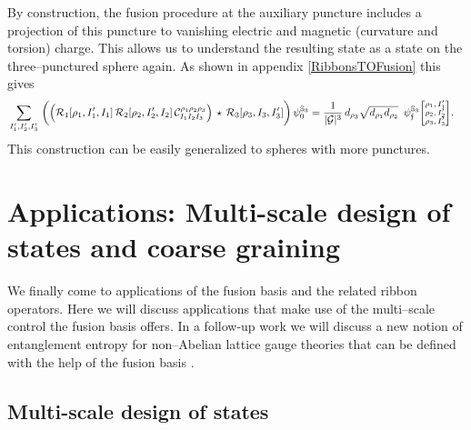 \documentclass[nofootinbib,superscriptaddress,eqsecnum,tightenlines,11pt]{revtex4-1}
\renewcommand{\S}{{\mathbb S}}
\begin{document}
By construction, the fusion procedure at the auxiliary puncture includes a projection of this puncture to vanishing electric and magnetic (curvature and torsion) charge. This allows us to understand the resulting state as a state on the three--punctured sphere again. As shown in appendix \ref{RibbonsTOFusion} this gives
\begin{align}
&\sum_{I_1',I_2',I_3'}\,    \bigg(\Big( \mathcal{R}_1[\rho_1,I_1',I_1] \, \mathcal{R}_2[\rho_2,I_2',I_2] \,  \mathcal{C}^{\rho_1\rho_2\rho_3}_{I_1 I_2 I_3}\Big) \, \star\, {\cal R}_3[\rho_3,I_3,I'_3] \bigg) \,\psi_0^{{\mathbb S}_3} = \frac{1}{|{\cal G}|^3 } \,d_{\rho_3}  \sqrt{ d_{\rho_1}d_{\rho_2} } \, \,\, \psi^{\S_3}_{\frak f}
	 { \scriptsize\begin{bmatrix} \rho_1,I_1'\\ \rho_2,I_2'\\ \rho_3,I'_3\end{bmatrix}} .
\end{align}
This construction can be easily generalized to spheres with more punctures. 




\section{Applications: Multi-scale design of states and coarse graining \label{sec_coarsegraining}}


 We finally come to applications of the fusion basis and the related ribbon operators. Here we will discuss applications that make use of the multi--scale control the fusion basis offers.  In a follow-up work we will discuss a new notion of entanglement entropy for non--Abelian lattice gauge theories that can be defined with the help of the fusion basis \cite{Toappear}.


\subsection{Multi-scale design of states}\label{multiscale}
\end{document}
